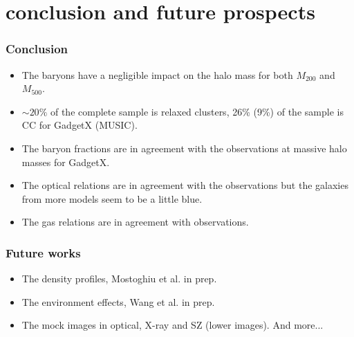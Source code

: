 \documentclass[aspectratio=1610]{beamer}
\begin{document}

\section{conclusion and future prospects}
\begin{frame}
  \frametitle{Conclusion}
  {\Large
  \begin{itemize}
    \item The baryons have a negligible impact on the halo mass for both $M_{200}$ and $M_{500}$.
    \item $\sim 20 \%$ of the complete sample is relaxed clusters, 26\% (9\%) of the sample is CC for GadgetX (MUSIC).
    \item The baryon fractions are in agreement with the observations at massive halo masses for GadgetX.
    \item The optical relations are in agreement with the observations but the galaxies from more models seem to be a little blue.
    \item The gas relations are in agreement with observations.
  \end{itemize}}
\end{frame}

\begin{frame}
  \frametitle{Future works}
  \begin{itemize}
    \item The density profiles, Mostoghiu et al. in prep.
    \item The environment effects, Wang et al. in prep.
    \item The mock images in optical, X-ray and SZ (lower images). \alert{And more...}
  \end{itemize}
\end{frame}
\end{document}
